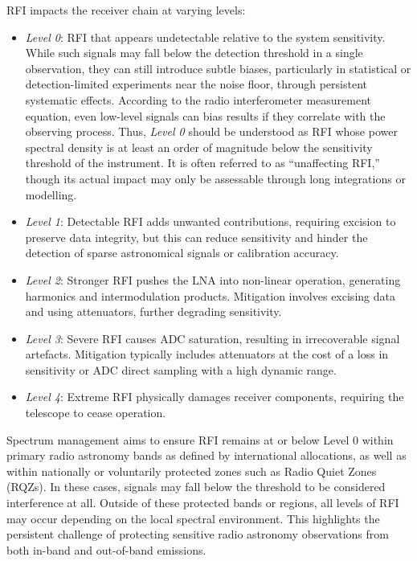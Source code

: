 RFI impacts the receiver chain at varying levels:
\begin{itemize}
\item \emph{Level 0}: RFI that appears undetectable relative to the system sensitivity. While such signals may fall below the detection threshold in a single observation, they can still introduce subtle biases, particularly in statistical or detection-limited experiments near the noise floor, through persistent systematic effects. According to the radio interferometer measurement equation, even low-level signals can bias results if they correlate with the observing process. Thus, \emph{Level 0} should be understood as RFI whose power spectral density is at least an order of magnitude below the sensitivity threshold of the instrument. It is often referred to as “unaffecting RFI,” though its actual impact may only be assessable through long integrations or modelling.
\item \emph{Level 1}: Detectable RFI adds unwanted contributions, requiring excision to preserve data integrity, but this can reduce sensitivity and hinder the detection of sparse astronomical signals or calibration accuracy.
\item \emph{Level 2}: Stronger RFI pushes the LNA into non-linear operation, generating harmonics and intermodulation products. Mitigation involves excising data and using attenuators, further degrading sensitivity.
\item \emph{Level 3}: Severe RFI causes ADC saturation, resulting in irrecoverable signal artefacts. Mitigation typically includes attenuators at the cost of a loss in sensitivity or ADC direct sampling with a high dynamic range.
\item \emph{Level 4}: Extreme RFI physically damages receiver components, requiring the telescope to cease operation.
\end{itemize}
Spectrum management aims to ensure RFI remains at or below Level 0 within primary radio astronomy bands as defined by international allocations, as well as within nationally or voluntarily protected zones such as Radio Quiet Zones (RQZs). In these cases, signals may fall below the threshold to be considered interference at all. Outside of these protected bands or regions, all levels of RFI may occur depending on the local spectral environment. This highlights the persistent challenge of protecting sensitive radio astronomy observations from both in-band and out-of-band emissions.



